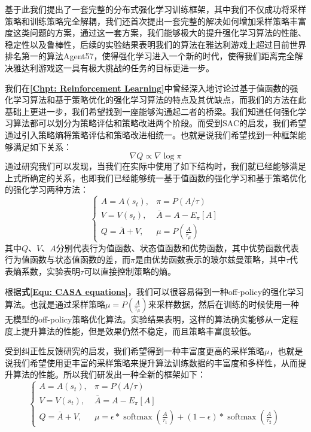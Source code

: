 基于此我们提出了一套完整的分布式强化学习训练框架，其中我们不仅成功将采样策略和训练策略完全解耦，我们还首次提出一套完整的解决如何增加采样策略丰富度这类问题的方案，通过这一套方案，我们能够极大的提升强化学习算法的性能、稳定性以及鲁棒性，后续的实验结果表明我们的算法在雅达利游戏上超过目前世界排名第一的算法Agent57，使得强化学习进入一个新的时代，使得我们距离完全解决雅达利游戏这一具有极大挑战的任务的目标更进一步。

我们在\textbf{\ref{Chpt: Reinforcement Learning}}中曾经深入地讨论过基于值函数的强化学习算法和基于策略优化的强化学习算法的特点及其优缺点，而我们的方法在此基础上更进一步，我们希望找到一座能够沟通起二者的桥梁。我们知道任何强化学习算法都可以划分为策略评估和策略改进两个阶段。而受到SAC的启发，我们希望通过引入策略熵将策略评估和策略改进相统一。也就是说我们希望找到一种框架能够满足如下关系：
\begin{equation}
    \nabla Q \propto \nabla \log \pi 
\end{equation}
通过研究我们可以发现，当我们在实际中使用了如下结构时，我们就已经能够满足上式所确定的关系，也即我们已经能够统一基于值函数的强化学习和基于策略优化的强化学习两种方法：
\begin{equation}
\label{Equ: CASA equations}
    \left\{\begin{array}{ll}
A=A\left(s_{t}\right), & \pi=P(A / \tau) \\

V=V\left(s_{t}\right), & \bar{A}=A-E_{\pi}[A] \\

 Q=\bar{A}+V, & \mu=P(\frac{A}{\tau_\mu})
\end{array}\right.
\end{equation}
其中$Q$、$V$、$A$分别代表行为值函数、状态值函数和优势函数，其中优势函数代表行为值函数与状态值函数的差，而$\pi$是由优势函数表示的玻尔兹曼策略，其中$\tau$代表熵系数，实验表明$\tau$可以直接控制策略的熵。

根据\textbf{式\eqref{Equ: CASA equations}}，我们可以很容易得到一种off-policy的强化学习算法。也就是通过采样策略$\mu=P(\frac{A}{\tau_\mu})$来采样数据，然后在训练的时候使用一种无模型的off-policy策略优化算法。实验结果表明，这样的算法确实能够从一定程度上提升算法的性能，但是效果仍然不稳定，而且策略丰富度较低。

受到纠正性反馈研究的启发，我们希望得到一种丰富度更高的采样策略$\mu$，也就是说我们希望使用更丰富的采样策略来提升算法训练数据的丰富度和多样性，从而提升算法的性能。所以我们研发出一种全新的框架如下：
\begin{equation}
\label{Equ: diversity pi equations}
    \left\{\begin{array}{ll}
A=A\left(s_{t}\right), & \pi=P(A / \tau) \\

V=V\left(s_{t}\right), & \bar{A}=A-E_{\pi}[A] \\

 Q=\bar{A}+V, & \mu=\epsilon * \operatorname{softmax}\left(\frac{A}{\tau_{1}}\right)+(1-\epsilon) * \operatorname{softmax}\left(\frac{A}{\tau_{2}}\right)
\end{array}\right.
\end{equation}

